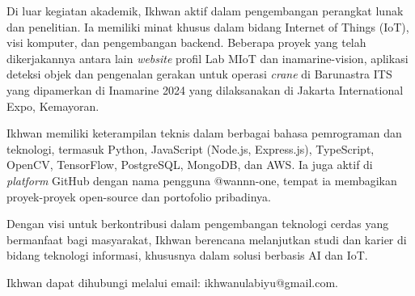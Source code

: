 Di luar kegiatan akademik, Ikhwan aktif dalam pengembangan perangkat lunak dan penelitian. Ia memiliki minat khusus dalam bidang Internet of Things (IoT), visi komputer, dan pengembangan backend. Beberapa proyek yang telah dikerjakannya antara lain \emph{website} profil Lab MIoT dan inamarine-vision, aplikasi deteksi objek dan pengenalan gerakan untuk operasi \emph{crane} di Barunastra ITS yang dipamerkan di Inamarine 2024 yang dilaksanakan di Jakarta International Expo, Kemayoran.

Ikhwan memiliki keterampilan teknis dalam berbagai bahasa pemrograman dan teknologi, termasuk Python, JavaScript (Node.js, Express.js), TypeScript, OpenCV, TensorFlow, PostgreSQL, MongoDB, dan AWS. Ia juga aktif di \emph{platform} GitHub dengan nama pengguna @wannn-one, tempat ia membagikan proyek-proyek open-source dan portofolio pribadinya.

Dengan visi untuk berkontribusi dalam pengembangan teknologi cerdas yang bermanfaat bagi masyarakat, Ikhwan berencana melanjutkan studi dan karier di bidang teknologi informasi, khususnya dalam solusi berbasis AI dan IoT.

Ikhwan dapat dihubungi melalui email: ikhwanulabiyu@gmail.com.